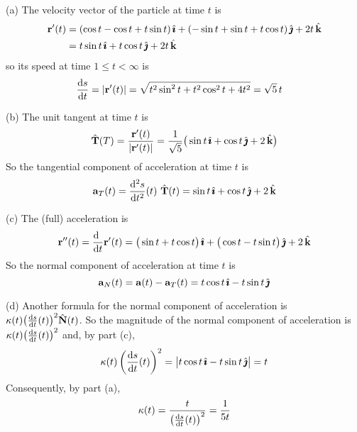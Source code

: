 \begin{solution} (a) The velocity vector of the particle at time $t$
is
\begin{align*}
\mathbf{r}'(t) &= (\cos t - \cos t + t \sin t )\,\hat{\pmb{\imath}} 
         + (-\sin t + \sin t  +  t \cos t )\,\hat{\pmb{\jmath}} 
         + 2t\,\hat{\mathbf{k}} \\
        &=  t \sin t \,\hat{\pmb{\imath}} 
         +  t \cos t \,\hat{\pmb{\jmath}} 
         + 2t\,\hat{\mathbf{k}}
\end{align*}
so its speed at time $1\le t<\infty$ is
\begin{align*}
\diff{s}{t}=|\vr'(t)| & = \sqrt{t^2\sin^2t + t^2\cos^2t +4t^2}
           =\sqrt{5}\, t
\end{align*}


\noindent (b)
The unit tangent at time $t$ is
\begin{equation*}
\hat{\mathbf{T}}(T) = \frac{\mathbf{r}'(t)}{|\mathbf{r}'(t)|}
           =\frac{1}{\sqrt{5}}\big(  \sin t \,\hat{\pmb{\imath}} 
                                  + \cos t \,\hat{\pmb{\jmath}} 
                                  + 2\,\hat{\mathbf{k}}\big)
\end{equation*}
So the tangential component of acceleration at time $t$ is
\begin{equation*}
\va_T(t) = \difftwo{s}{t}(t)\ \hat\vT(t)
          =  \sin t \,\hi   + \cos t \,\hj   + 2\,\hk
\end{equation*}

\noindent (c)
The (full) acceleration is 
\begin{equation*}
\vr''(t) =\diff{\hfill}{t}\vr'(t)
         = \big(\sin t + t\cos t\big) \,\hi 
         + \big(\cos t - t\sin t\big) \,\hj 
         + 2\,\hk
\end{equation*}
So the normal component of acceleration at time $t$ is
\begin{equation*}
\mathbf{a}_N(t) = \mathbf{a}(t) - \mathbf{a}_T(t)
          =  t\cos t \,\hat{\pmb{\imath}}   - t\sin t \,\hat{\pmb{\jmath}}  
\end{equation*}

\noindent (d)
Another formula for the normal component of acceleration
is $\ka(t)\big(\diff{s}{t}(t)\big)^2\hat\vN(t)$. So the magnitude
of the normal component of acceleration is $\ka(t)\big(\diff{s}{t}(t)\big)^2$
and, by part (c),
\begin{align*}
\ka(t)\left(\diff{s}{t}(t)\right)^2
=\big|t\cos t \,\hi   - t\sin t \,\hj \big|
=t
\end{align*}
Consequently, by part (a),
\begin{equation*}
\ka(t) = \frac{t}{\left(\diff{s}{t}(t)\right)^2}
       = \frac{1}{5t}
\end{equation*}
\end{solution}

